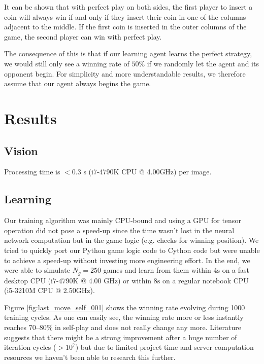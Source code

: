 \documentclass[10pt,twocolumn,letterpaper]{article}
\begin{document}
It can be shown that with perfect play on both sides, the first player to insert a coin will always win if and only if they insert their coin in one of the columns adjacent to the middle.
If the first coin is inserted in the outer columns of the game, the second player can win with perfect play.

The consequence of this is that if our learning agent learns the perfect strategy, we would still only see a winning rate of $50\%$ if we randomly
let the agent and its opponent begin.
For simplicity and more understandable results, we therefore assume that our agent always begins the game.

\section{Results}

\subsection{Vision}
Processing time is $< 0.3$ s (i7-4790K CPU @ 4.00GHz) per image.

\subsection{Learning}
Our training algorithm was mainly CPU-bound and using a GPU for tensor
operation did not pose a speed-up since the time wasn't lost in the neural
network computation but in the game logic (e.g. checks for winning position).
We tried to quickly port our Python game logic code to Cython code but were
unable to achieve a speed-up without investing more engineering effort.
In the end, we were able to simulate $N_g = 250$ games and learn from
them within $4\mathrm{s}$ on a fast desktop CPU (i7-4790K @ 4.00 GHz)
or within $8 \mathrm{s}$ on a regular notebook CPU (i5-3210M CPU @ 2.50GHz).

Figure \ref{fig:last_move_self_001} shows the winning rate evolving during
1000 training cycles.
As one can easily see, the winning rate more or less
instantly reaches $70–80 \%$ in self-play and does not really change any more.
Literature suggests that there might be a strong improvement after a huge number of iteration cycles ($> 10^7$) but due to limited project time and server computation resources we haven't been able to research this further.
\end{document}
